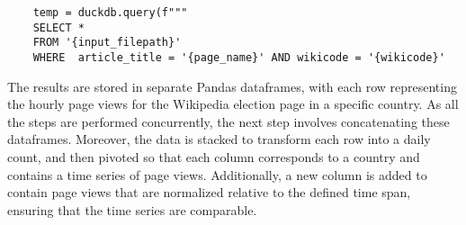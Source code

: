 \begin{verbatim}
    temp = duckdb.query(f"""
    SELECT *
    FROM '{input_filepath}'
    WHERE  article_title = '{page_name}' AND wikicode = '{wikicode}'
\end{verbatim}

The results are stored in separate Pandas dataframes, with each row representing the hourly page views for the Wikipedia election page in a specific country. As all the steps are performed concurrently, the next step involves concatenating these dataframes. Moreover, the data is stacked to transform each row into a daily count, and then pivoted so that each column corresponds to a country and contains a time series of page views. Additionally, a new column is added to contain page views that are normalized relative to the defined time span, ensuring that the time series are comparable.








